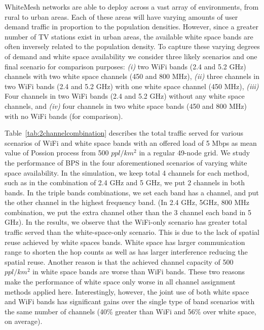 WhiteMesh networks are able to deploy across a vast array of environments, from
rural to urban areas. Each of these areas will have varying amounts of user
demand traffic in proportion to the population densities. 
However, since a greater number of TV stations exist in urban areas, the available 
white space bands are often inversely related to the population density. 
To capture these varying degrees of demand 
and white space availability we consider three likely scenarios and one final 
scenario for comparison purposes: {\it (i)} two WiFi bands (2.4 and
5.2 GHz) channels with two white space channels (450 and 800 MHz), {\it (ii)} 
three channels in two WiFi bands (2.4 and 5.2 GHz) with one white space channel 
(450 MHz), {\it (iii)} Four channels in two WiFi bands (2.4 and 5.2 GHz) without 
any white space channels, and {\it (iv)} four channels in two white space bands 
(450 and 800 MHz) with no WiFi bands (for comparison).

Table~\ref{tab:2channelcombination} describes the total traffic served 
for various scenarios of WiFi and white space bands with an offered load 
of 5 Mbps as mean value of Possion process from 500 $ppl/km^2$ in a regular 49-node grid. 
We study the performance of BPS in the four aforementioned scenarios of varying 
white space availability. In the simulation, we keep total 4 channels for each
method, such as in the combination of 2.4 GHz and 5 GHz, we put 2 channels in both 
bands. In the triple bands combinations, we set each band has a channel, and put the 
other channel in the highest frequency band. (In 2.4 GHz, 5GHz, 800 MHz combination, 
we put the extra channel other than the 3 channel each band in 5 GHz). 
In the results, we observe that the WiFi-only scenario has greater total traffic served 
than the white-space-only scenario. This is due to the lack of spatial reuse achieved 
by white spaces bands. White space has larger communication range to shorten 
the hop counts as well as has larger interference reducing the spatial reuse. 
Another reason is that the achieved channel capacity of 500 $ppl/km^2$ in white 
space bands are worse than WiFi bands. These two reasons make the performance of 
white space only worse in all channel assignment methods applied here.
Interestingly, however, the joint use of both white space and WiFi bands has 
significant gains over the single type of band scenarios with the same number of 
channels (40\% greater than WiFi and 56\% over white space, on average). 



